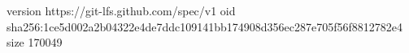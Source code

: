 version https://git-lfs.github.com/spec/v1
oid sha256:1ce5d002a2b04322e4de7ddc109141bb174908d356ec287e705f56f8812782e4
size 170049
